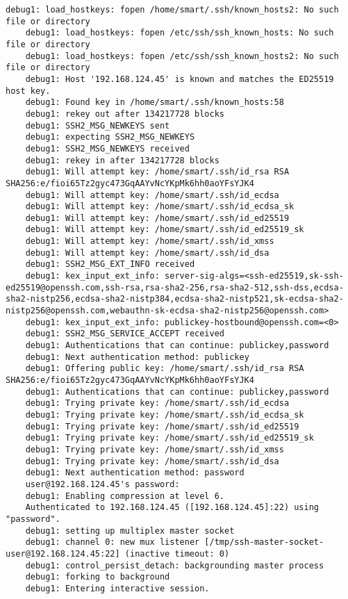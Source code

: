 \begin{Verbatim}[frame=single]
    debug1: load_hostkeys: fopen /home/smart/.ssh/known_hosts2: No such file or directory
    debug1: load_hostkeys: fopen /etc/ssh/ssh_known_hosts: No such file or directory
    debug1: load_hostkeys: fopen /etc/ssh/ssh_known_hosts2: No such file or directory
    debug1: Host '192.168.124.45' is known and matches the ED25519 host key.
    debug1: Found key in /home/smart/.ssh/known_hosts:58
    debug1: rekey out after 134217728 blocks
    debug1: SSH2_MSG_NEWKEYS sent
    debug1: expecting SSH2_MSG_NEWKEYS
    debug1: SSH2_MSG_NEWKEYS received
    debug1: rekey in after 134217728 blocks
    debug1: Will attempt key: /home/smart/.ssh/id_rsa RSA SHA256:e/fioi65Tz2gyc473GqAAYvNcYKpMk6hh0aoYFsYJK4
    debug1: Will attempt key: /home/smart/.ssh/id_ecdsa 
    debug1: Will attempt key: /home/smart/.ssh/id_ecdsa_sk 
    debug1: Will attempt key: /home/smart/.ssh/id_ed25519 
    debug1: Will attempt key: /home/smart/.ssh/id_ed25519_sk 
    debug1: Will attempt key: /home/smart/.ssh/id_xmss 
    debug1: Will attempt key: /home/smart/.ssh/id_dsa 
    debug1: SSH2_MSG_EXT_INFO received
    debug1: kex_input_ext_info: server-sig-algs=<ssh-ed25519,sk-ssh-ed25519@openssh.com,ssh-rsa,rsa-sha2-256,rsa-sha2-512,ssh-dss,ecdsa-sha2-nistp256,ecdsa-sha2-nistp384,ecdsa-sha2-nistp521,sk-ecdsa-sha2-nistp256@openssh.com,webauthn-sk-ecdsa-sha2-nistp256@openssh.com>
    debug1: kex_input_ext_info: publickey-hostbound@openssh.com=<0>
    debug1: SSH2_MSG_SERVICE_ACCEPT received
    debug1: Authentications that can continue: publickey,password
    debug1: Next authentication method: publickey
    debug1: Offering public key: /home/smart/.ssh/id_rsa RSA SHA256:e/fioi65Tz2gyc473GqAAYvNcYKpMk6hh0aoYFsYJK4
    debug1: Authentications that can continue: publickey,password
    debug1: Trying private key: /home/smart/.ssh/id_ecdsa
    debug1: Trying private key: /home/smart/.ssh/id_ecdsa_sk
    debug1: Trying private key: /home/smart/.ssh/id_ed25519
    debug1: Trying private key: /home/smart/.ssh/id_ed25519_sk
    debug1: Trying private key: /home/smart/.ssh/id_xmss
    debug1: Trying private key: /home/smart/.ssh/id_dsa
    debug1: Next authentication method: password
    user@192.168.124.45's password: 
    debug1: Enabling compression at level 6.
    Authenticated to 192.168.124.45 ([192.168.124.45]:22) using "password".
    debug1: setting up multiplex master socket
    debug1: channel 0: new mux listener [/tmp/ssh-master-socket-user@192.168.124.45:22] (inactive timeout: 0)
    debug1: control_persist_detach: backgrounding master process
    debug1: forking to background
    debug1: Entering interactive session.

\end{Verbatim}
